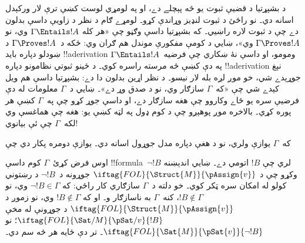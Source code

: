 \documentclass[../../../include/open-logic-section]{subfiles}
\begin{document}
      {}
      {}


د بشپړتيا د قضيې ثبوت يو څه پېچلے دے، او په لومړي لوست کښې ترې
لار ورکېدل اسانه دي۔ نو راځئ د ثبوت لنډيز وړاندې کړو۔ لومړے ګام د
نظر د زاويې داسې بدلون دے چې د ثبوت لاره راښيي۔ که بشپړتيا داسې
وګڼو چې «هر کله $\Gamma \Entails !A$ وي، نو
$\Gamma \Proves !A$ وي»، ښايي د کومې مفکورې موندل هم ګران وي:
ځکه د~$\Gamma \Proves !A$ د ښودلو دپاره بايد !!a{derivation}
ومومو، او داسې نۀ ښکاري چې فرضيه~$\Gamma \Entails !A$ په دې کښې
څه مرسته راسره کوي۔ د ځينو ثبوتي نظامونو دپاره !!a{derivation}
نېغ جوړېدے شي، خو موږ لږه بله لار نيسو۔ د نظر اړين بدلون دا دے:
بشپړتيا داسې هم ويل کېدے شي چې «که~$\Gamma$ سازګار وي، نو د صدق
وړ دے»۔ ښايي د~$\Gamma$ معلومات له دې فرضيې سره يو ځاے وکاروو چې
هغه سازګار دے، او داسې 
جوړ کړو چې په~$\Gamma$ کښې هر
 پوره کړي۔ بالاخره موږ پوهېږو
چې د کوم ډول  په لټه کښې
يو: هغه چې هماغسې وي لکه~$\Gamma$ چې ئې بيانوي!{}

که~$\Gamma$ يوازې  ولري، نو د هغې دپاره
مدل جوړول اسانه دي۔ يوازې دومره پکار دي چې

اوس فرض کړئ~$\Gamma$ کوم داسې !!{formula}~$\lnot !B$ لري چې
$!B$ اتومي دے۔ ښايي اندېښنه وکړو چې د
$\iftag{FOL}{\Struct{M}}{\pAssign{v}}$ جوړونه د~$\lnot !B$ د
رښتوني کولو له امکان سره ټکر کوي۔ خو دلته د~$\Gamma$ سازګاري
کار راځي: که $\lnot !B \in \Gamma$ وي، نو
$!B \notin \Gamma$، کنه~$\Gamma$ به ناسازګار و۔ او که
$!B \notin \Gamma$ وي، نو زموږ د
$\iftag{FOL}{\Struct{M}}{\pAssign{v}}$ د جوړونې له مخې
$\iftag{FOL}{\Sat/{M}}{\pSat/{v}}{!B}$؛ نو
$\iftag{FOL}{\Sat{M}}{\pSat{v}}{\lnot !B}$۔ تر دې ځايه هر څه سم
دي۔
\end{document}
